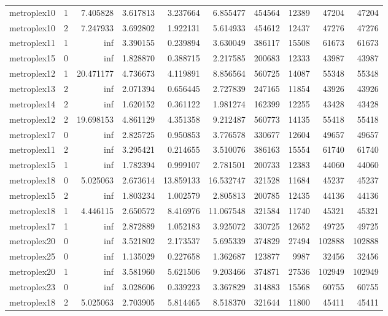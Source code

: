 \begin{longtable}{|l|r|r|r|r|r|r|r|r|r|}
metroplex10 & 1 & 7.405828 & 3.617813 & 3.237664 & 6.855477 & 454564 & 12389 & 47204 & 47204 \\
metroplex10 & 2 & 7.247933 & 3.692802 & 1.922131 & 5.614933 & 454612 & 12437 & 47276 & 47276 \\
metroplex11 & 1 & inf & 3.390155 & 0.239894 & 3.630049 & 386117 & 15508 & 61673 & 61673 \\
metroplex15 & 0 & inf & 1.828870 & 0.388715 & 2.217585 & 200683 & 12333 & 43987 & 43987 \\
metroplex12 & 1 & 20.471177 & 4.736673 & 4.119891 & 8.856564 & 560725 & 14087 & 55348 & 55348 \\
metroplex13 & 2 & inf & 2.071394 & 0.656445 & 2.727839 & 247165 & 11854 & 43926 & 43926 \\
metroplex14 & 2 & inf & 1.620152 & 0.361122 & 1.981274 & 162399 & 12255 & 43428 & 43428 \\
metroplex12 & 2 & 19.698153 & 4.861129 & 4.351358 & 9.212487 & 560773 & 14135 & 55418 & 55418 \\
metroplex17 & 0 & inf & 2.825725 & 0.950853 & 3.776578 & 330677 & 12604 & 49657 & 49657 \\
metroplex11 & 2 & inf & 3.295421 & 0.214655 & 3.510076 & 386163 & 15554 & 61740 & 61740 \\
metroplex15 & 1 & inf & 1.782394 & 0.999107 & 2.781501 & 200733 & 12383 & 44060 & 44060 \\
metroplex18 & 0 & 5.025063 & 2.673614 & 13.859133 & 16.532747 & 321528 & 11684 & 45237 & 45237 \\
metroplex15 & 2 & inf & 1.803234 & 1.002579 & 2.805813 & 200785 & 12435 & 44136 & 44136 \\
metroplex18 & 1 & 4.446115 & 2.650572 & 8.416976 & 11.067548 & 321584 & 11740 & 45321 & 45321 \\
metroplex17 & 1 & inf & 2.872889 & 1.052183 & 3.925072 & 330725 & 12652 & 49725 & 49725 \\
metroplex20 & 0 & inf & 3.521802 & 2.173537 & 5.695339 & 374829 & 27494 & 102888 & 102888 \\
metroplex25 & 0 & inf & 1.135029 & 0.227658 & 1.362687 & 123877 & 9987 & 32456 & 32456 \\
metroplex20 & 1 & inf & 3.581960 & 5.621506 & 9.203466 & 374871 & 27536 & 102949 & 102949 \\
metroplex23 & 0 & inf & 3.028606 & 0.339223 & 3.367829 & 314883 & 15568 & 60755 & 60755 \\
metroplex18 & 2 & 5.025063 & 2.703905 & 5.814465 & 8.518370 & 321644 & 11800 & 45411 & 45411 \\

\end{longtable}
